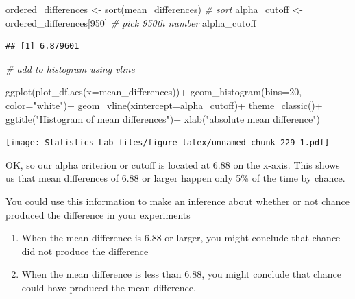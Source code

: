 \documentclass[
]{book}
\newenvironment{Shaded}{\begin{snugshade}}{\end{snugshade}}
\newcommand{\AttributeTok}[1]{\textcolor[rgb]{0.77,0.63,0.00}{#1}}
\newcommand{\CommentTok}[1]{\textcolor[rgb]{0.56,0.35,0.01}{\textit{#1}}}
\newcommand{\DecValTok}[1]{\textcolor[rgb]{0.00,0.00,0.81}{#1}}
\newcommand{\FunctionTok}[1]{\textcolor[rgb]{0.00,0.00,0.00}{#1}}
\newcommand{\NormalTok}[1]{#1}
\newcommand{\OtherTok}[1]{\textcolor[rgb]{0.56,0.35,0.01}{#1}}
\newcommand{\SpecialCharTok}[1]{\textcolor[rgb]{0.00,0.00,0.00}{#1}}
\newcommand{\StringTok}[1]{\textcolor[rgb]{0.31,0.60,0.02}{#1}}
\begin{document}
\begin{Shaded}
\begin{Highlighting}[]
\NormalTok{ordered\_differences }\OtherTok{\textless{}{-}} \FunctionTok{sort}\NormalTok{(mean\_differences) }\CommentTok{\# sort}
\NormalTok{alpha\_cutoff }\OtherTok{\textless{}{-}}\NormalTok{ ordered\_differences[}\DecValTok{950}\NormalTok{] }\CommentTok{\# pick 950th number}
\NormalTok{alpha\_cutoff}
\end{Highlighting}
\end{Shaded}

\begin{verbatim}
## [1] 6.879601
\end{verbatim}

\begin{Shaded}
\begin{Highlighting}[]
\CommentTok{\# add to histogram using vline}

\FunctionTok{ggplot}\NormalTok{(plot\_df,}\FunctionTok{aes}\NormalTok{(}\AttributeTok{x=}\NormalTok{mean\_differences))}\SpecialCharTok{+}
  \FunctionTok{geom\_histogram}\NormalTok{(}\AttributeTok{bins=}\DecValTok{20}\NormalTok{, }\AttributeTok{color=}\StringTok{"white"}\NormalTok{)}\SpecialCharTok{+}
  \FunctionTok{geom\_vline}\NormalTok{(}\AttributeTok{xintercept=}\NormalTok{alpha\_cutoff)}\SpecialCharTok{+}
  \FunctionTok{theme\_classic}\NormalTok{()}\SpecialCharTok{+}
  \FunctionTok{ggtitle}\NormalTok{(}\StringTok{"Histogram of mean differences"}\NormalTok{)}\SpecialCharTok{+}
  \FunctionTok{xlab}\NormalTok{(}\StringTok{"absolute mean difference"}\NormalTok{)}
\end{Highlighting}
\end{Shaded}

\texttt{[image: Statistics\_Lab\_files/figure-latex/unnamed-chunk-229-1.pdf]}

OK, so our alpha criterion or cutoff is located at 6.88 on the x-axis. This shows us that mean differences of 6.88 or larger happen only 5\% of the time by chance.

You could use this information to make an inference about whether or not chance produced the difference in your experiments

\begin{enumerate}
\def\labelenumi{\arabic{enumi}.}
\item
  When the mean difference is 6.88 or larger, you might conclude that chance did not produce the difference
\item
  When the mean difference is less than 6.88, you might conclude that chance could have produced the mean difference.
\end{enumerate}
\end{document}

